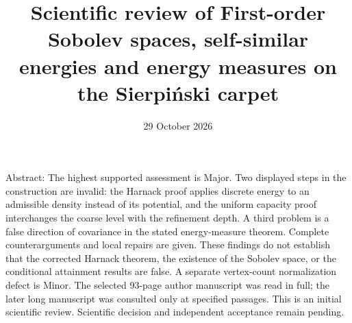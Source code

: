 \documentclass[10pt]{article}
\title{Scientific review of
First-order Sobolev spaces, self-similar energies and energy measures on the Sierpiński carpet}
\author{}
\date{29 October 2026}
\begin{document}
\maketitle
Abstract: The highest supported assessment is Major. Two displayed steps in the construction are invalid: the Harnack proof applies discrete energy to an admissible density instead of its potential, and the uniform capacity proof interchanges the coarse level with the refinement depth. A third problem is a false direction of covariance in the stated energy-measure theorem. Complete counterarguments and local repairs are given. These findings do not establish that the corrected Harnack theorem, the existence of the Sobolev space, or the conditional attainment results are false. A separate vertex-count normalization defect is Minor. The selected 93-page author manuscript was read in full; the later long manuscript was consulted only at specified passages. This is an initial scientific review. Scientific decision and independent acceptance remain pending.\par
\end{document}
